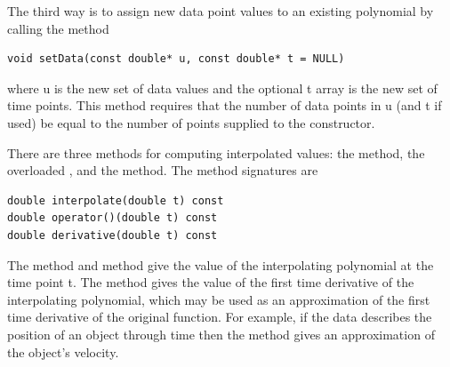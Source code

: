 The third way is to assign new data point values to an existing polynomial by calling the  method
\begin{verbatim}
void setData(const double* u, const double* t = NULL)
\end{verbatim}
where u is the new set of data values and the optional t array is the new set of time points. This method requires that the number of data points in u (and t if used) be equal to the number of points supplied to the  constructor.

There are three methods for computing interpolated values: the  method, the overloaded , and the  method. The method signatures are
\begin{verbatim}
double interpolate(double t) const
double operator()(double t) const
double derivative(double t) const
\end{verbatim}
The  method and  method give the value of the interpolating polynomial at the time point t. The  method gives the value of the first time derivative of the interpolating polynomial, which may be used as an approximation of the first time derivative of the original function. For example, if the data describes the position of an object through time then the  method gives an approximation of the object's velocity.

